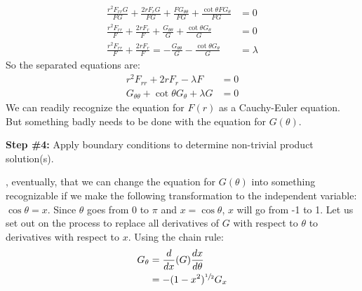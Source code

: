 \begin{align*}
\frac{r^2 F_{rr}G}{FG} + \frac{2rF_rG}{FG} + \frac{FG_{\theta\theta}}{FG} + \frac{\cot{\theta}FG_{\theta}}{FG} &= 0 \\
\frac{r^2F_{rr}}{F} + \frac{2rF_r}{F} + \frac{G_{\theta\theta}}{G} + \frac{\cot{\theta}G_{\theta}}{G} &= 0 \\
\frac{r^2 F_{rr}}{F} + \frac{2rF_r}{F} = -\frac{G_{\theta\theta}}{G} - \frac{\cot{\theta}G_{\theta}}{G} &= \lambda
\end{align*}
So the separated equations are:
\begin{align*}
r^2F_{rr} + 2rF_{r} - \lambda F &= 0 \\
G_{\theta\theta} + \cot{\theta}G_{\theta} + \lambda G &= 0
\end{align*}
We can readily recognize the equation for $F(r)$ as a Cauchy-Euler equation.  But something badly needs to be done with the equation for $G(\theta)$.

\vspace{0.25cm}

\noindent\textbf{Step \#4:} Apply boundary conditions to determine non-trivial product solution(s).

, eventually, that we can change the equation for $G(\theta)$ into something recognizable if we make the following transformation to the independent variable: $\cos{\theta} = x$.  Since $\theta$ goes from 0 to $\pi$ and $x = \cos{\theta}$, $x$ will go from -1 to 1. Let us set out on the process to replace all derivatives of $G$ with respect to $\theta$ to derivatives with respect to $x$. Using the chain rule:
\begin{align*}
G_{\theta} &= \frac{d}{dx}(G)\frac{dx}{d\theta} \\
&= -(1-x^2)^{\sfrac{1}{2}}G_x
\end{align*}

